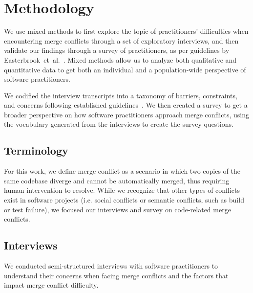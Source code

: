 \section{Methodology}\label{methodology}

We use mixed methods to first explore the topic of practitioners' difficulties when encountering merge conflicts through a set of exploratory interviews, and then validate our findings through a survey of practitioners, as per guidelines by \mbox{Easterbrook et al.}~\cite{easterbrook2008selecting}.
Mixed methods allow us to analyze both qualitative and quantitative data to get both an individual and a population-wide perspective of software practitioners.

We codified the interview transcripts into a taxonomy of barriers, constraints, and concerns following established guidelines~\cite{latoza2006maintaining, shull2008guide, tao2012software}.
We then created a survey to get a broader perspective on how software practitioners approach merge conflicts, using the vocabulary generated from the interviews to create the survey questions.

\subsection{Terminology}\label{terminology_methods}
For this work, we define merge conflict as a scenario in which two copies of the same codebase diverge and cannot be automatically merged, thus requiring human intervention to resolve. 
While we recognize that other types of conflicts exist in software projects (i.e. social conflicts or semantic conflicts, such as build or test failure), we focused our interviews and survey on code-related merge conflicts.

\subsection{Interviews}\label{interview_methods}

We conducted semi-structured interviews with software practitioners to understand their concerns when facing merge conflicts and the factors that impact merge conflict difficulty.

